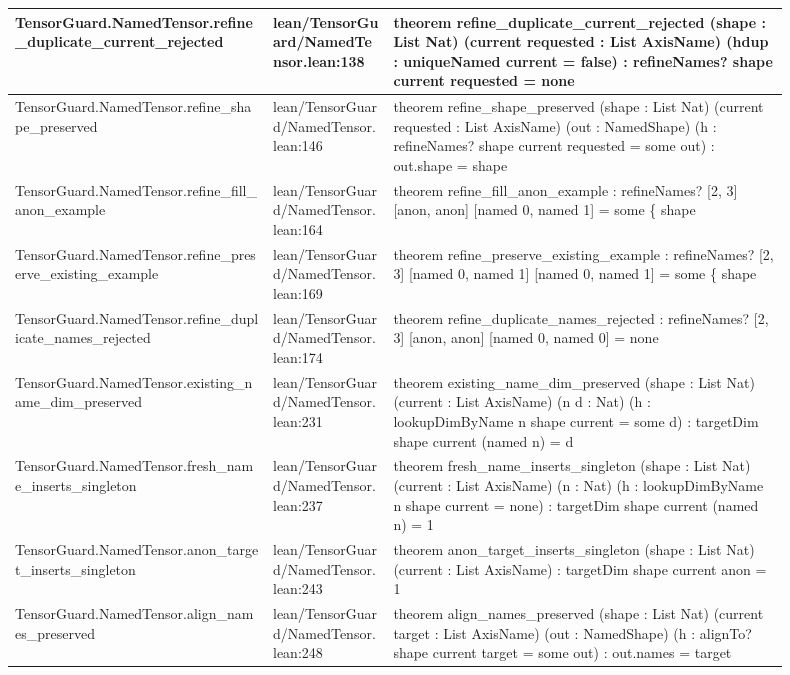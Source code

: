 \documentclass[10pt]{article}
\begin{document}
\begin{longtable}{|p{0.30\linewidth}|p{0.14\linewidth}|p{0.46\linewidth}|}
\hline
TensorGuard.NamedTensor.refine\_duplicate\_current\_rejected & lean/TensorGuard/NamedTensor.lean:138 & theorem refine\_duplicate\_current\_rejected (shape : List Nat) (current requested : List AxisName) (hdup : uniqueNamed current = false) : refineNames? shape current requested = none \\
\hline
TensorGuard.NamedTensor.refine\_shape\_preserved & lean/TensorGuard/NamedTensor.lean:146 & theorem refine\_shape\_preserved (shape : List Nat) (current requested : List AxisName) (out : NamedShape) (h : refineNames? shape current requested = some out) : out.shape = shape \\
\hline
TensorGuard.NamedTensor.refine\_fill\_anon\_example & lean/TensorGuard/NamedTensor.lean:164 & theorem refine\_fill\_anon\_example : refineNames? [2, 3] [anon, anon] [named 0, named 1] = some \{ shape \\
\hline
TensorGuard.NamedTensor.refine\_preserve\_existing\_example & lean/TensorGuard/NamedTensor.lean:169 & theorem refine\_preserve\_existing\_example : refineNames? [2, 3] [named 0, named 1] [named 0, named 1] = some \{ shape \\
\hline
TensorGuard.NamedTensor.refine\_duplicate\_names\_rejected & lean/TensorGuard/NamedTensor.lean:174 & theorem refine\_duplicate\_names\_rejected : refineNames? [2, 3] [anon, anon] [named 0, named 0] = none \\
\hline
TensorGuard.NamedTensor.existing\_name\_dim\_preserved & lean/TensorGuard/NamedTensor.lean:231 & theorem existing\_name\_dim\_preserved (shape : List Nat) (current : List AxisName) (n d : Nat) (h : lookupDimByName n shape current = some d) : targetDim shape current (named n) = d \\
\hline
TensorGuard.NamedTensor.fresh\_name\_inserts\_singleton & lean/TensorGuard/NamedTensor.lean:237 & theorem fresh\_name\_inserts\_singleton (shape : List Nat) (current : List AxisName) (n : Nat) (h : lookupDimByName n shape current = none) : targetDim shape current (named n) = 1 \\
\hline
TensorGuard.NamedTensor.anon\_target\_inserts\_singleton & lean/TensorGuard/NamedTensor.lean:243 & theorem anon\_target\_inserts\_singleton (shape : List Nat) (current : List AxisName) : targetDim shape current anon = 1 \\
\hline
TensorGuard.NamedTensor.align\_names\_preserved & lean/TensorGuard/NamedTensor.lean:248 & theorem align\_names\_preserved (shape : List Nat) (current target : List AxisName) (out : NamedShape) (h : alignTo? shape current target = some out) : out.names = target \\

\end{longtable}
\end{document}
